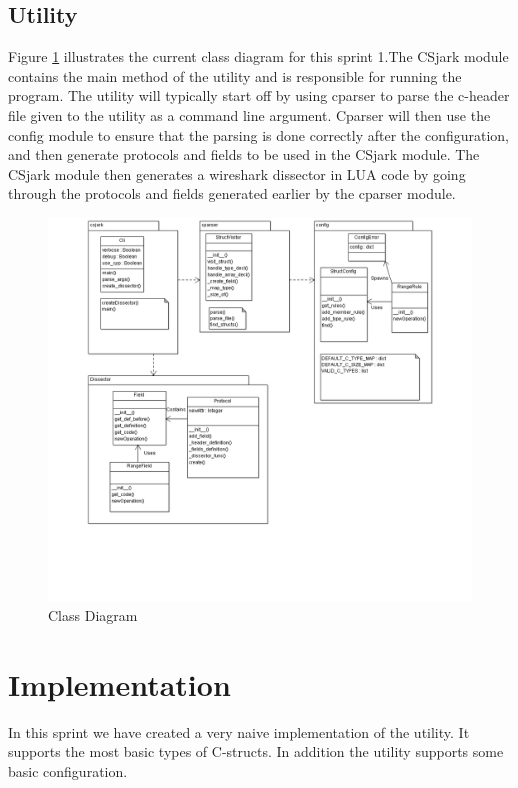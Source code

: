 \subsection{Utility}
Figure \ref{fig:sp1_class} illustrates the current class diagram for this sprint 1.The CSjark module contains the main method of the utility and is responsible for running the program. The utility will typically start off by using cparser to parse the c-header file given to the utility as a command line argument. Cparser will then use the config module to ensure that the parsing is done correctly after the configuration, and then generate protocols and fields to be used in the CSjark module. The CSjark module then generates a wireshark dissector in LUA code by going through the protocols and fields generated earlier by the cparser module. 

\begin{figure}[here]
\includegraphics[scale=0.4]{./sprints/img/class_diagram_s1.png}
\caption{Class Diagram}
\label{fig:sp1_class}
\end{figure}

\section{Implementation}

In this sprint we have created a very naive implementation of the utility. It supports the most basic types of C-structs. In addition the utility supports some basic configuration.

